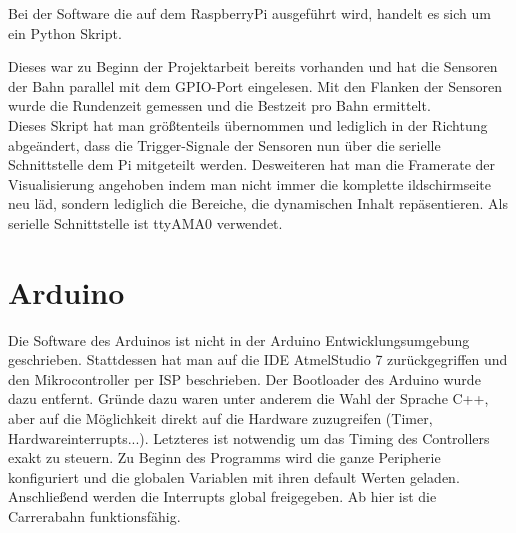\documentclass[a4paper, 11pt]{report}
\begin{document}
		Bei der Software die auf dem RaspberryPi ausgeführt wird, handelt es sich um ein Python Skript.

		Dieses war zu Beginn der Projektarbeit bereits vorhanden und hat die Sensoren
		der Bahn parallel mit dem GPIO-Port eingelesen. Mit den Flanken der Sensoren wurde die Rundenzeit gemessen und die Bestzeit pro Bahn ermittelt.\\
		Dieses Skript hat man größtenteils übernommen und lediglich in der Richtung abgeändert, dass die Trigger-Signale der Sensoren nun über die serielle Schnittstelle dem Pi mitgeteilt werden.
		Desweiteren hat man die Framerate der Visualisierung angehoben indem man nicht immer die komplette ildschirmseite neu läd, sondern lediglich die Bereiche, die dynamischen Inhalt repäsentieren.
		Als serielle Schnittstelle ist ttyAMA0 verwendet.
		\newpage
	\section{Arduino}
		Die Software des Arduinos ist nicht in der Arduino Entwicklungsumgebung
		geschrieben. Stattdessen hat man auf die IDE AtmelStudio 7 zurückgegriffen und den Mikrocontroller per ISP beschrieben.
		Der Bootloader des Arduino wurde dazu entfernt.
		Gründe dazu waren unter anderem die Wahl der Sprache C++,
		aber auf die Möglichkeit direkt auf die Hardware zuzugreifen (Timer, Hardwareinterrupts...).
		Letzteres ist notwendig um das Timing des Controllers exakt zu steuern.
		Zu Beginn des Programms wird die ganze Peripherie konfiguriert und die globalen Variablen mit ihren default Werten geladen.
		Anschließend werden die Interrupts global freigegeben. Ab hier ist die Carrerabahn funktionsfähig.\\
\end{document}
